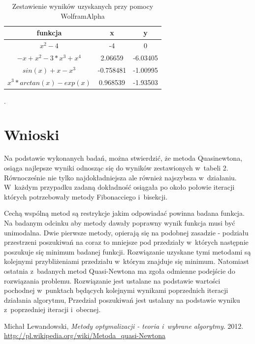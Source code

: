 \documentclass{classrep}
\begin{document}
 	\begin{table}[H]
		\begin{center}
		\begin{tabular}{|c|c|c|}
		\hline funkcja & x & y \\ 
\hline $x^2 - 4$ & -4 & 0 \\ 
\hline $-x + x^2 - 3*x^3 + x^4$  & 2.06659 & -6.03405 \\ 
\hline $sin(x)+x-x^3$  & -0.758481 & -1.00995 \\ 
\hline $x^3*arctan(x)-exp(x)$  & 0.968539 & -1.93503 \\ 
\hline 
\end{tabular} 
				\caption{Zestawienie wyników uzyskanych przy pomocy WolframAlpha }.
		\end{center}
		\label{wolfram}
	\end{table}
	

\section{Wnioski}

Na podstawie wykonanych badań, można stwierdzić, że metoda Quasi\-newtona, osiąga najlepsze wyniki odnosząc się do wyników zestawionych w~tabeli 2. Równocześnie nie tylko najdokładniejsza ale również najszybsza w~działaniu. W~każdym przypadku zadaną dokładność osiągała po około połowie iteracji których potrzebowały metody Fibonacciego i~bisekcji.

Cechą wspólną metod są restrykcje jakim odpowiadać powinna badana funkcja. Na badanym odcinku aby metody dawały poprawny wynik funkcja musi być unimodalna. Dwie pierwsze metody, opierają się na podobnej zasadzie - podziału przestrzeni poszukiwań na coraz to mniejsze pod przedziały w~których następnie poszukuje się minimum badanej funkcji. Rozwiązanie uzyskane tymi metodami są kolejnymi przybliżeniami przedziału w~którym znajduje się minimum. Natomiast ostatnia z~badanych metod Quasi-Newtona ma zgoła odmienne podejście do rozwiązania problemu. Rozwiązanie jest ustalane na podstawie wartości pochodnej w~punktach będących kolejnymi wynikami poprzednich iteracji działania algorytmu, Przedział poszukiwań jest ustalany na podstawie wyniku z~poprzedniej iteracji i~obecnej.

\begin{thebibliography}{9}
	Michał Lewandowski,  \emph{Metody optymalizacji - teoria i~wybrane algorytmy}.  2012.
	\url{http://pl.wikipedia.org/wiki/Metoda\_quasi-Newtona}
\end{thebibliography}
\end{document}
